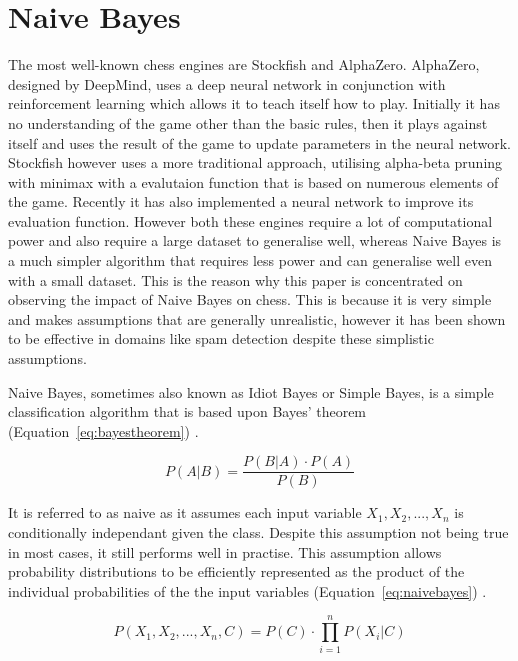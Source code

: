 \section{Naive Bayes}
The most well-known chess engines are Stockfish and AlphaZero. AlphaZero, designed by DeepMind, uses a deep neural network in conjunction with reinforcement learning which allows it to teach itself how to play. Initially it has no understanding of the game other than the basic rules, then it plays against itself and uses the result of the game to update parameters in the neural network. Stockfish however uses a more traditional approach, utilising alpha-beta pruning with minimax with a evalutaion function that is based on numerous elements of the game. Recently it has also implemented a neural network to improve its evaluation function. However both these engines require a lot of computational power and also require a large dataset to generalise well, whereas Naive Bayes is a much simpler algorithm that requires less power and can generalise well even with a small dataset. This is the reason why this paper is concentrated on observing the impact of Naive Bayes on chess. This is because it is very simple and makes assumptions that are generally unrealistic, however it has been shown to be effective in domains like spam detection \cite{eberhardtBayesianSpamDetection2015} despite these simplistic assumptions. 

Naive Bayes, sometimes also known as Idiot Bayes or Simple Bayes, is a simple classification algorithm that is based upon Bayes' theorem (Equation~\ref{eq:bayestheorem}) \cite{lowdNaiveBayesModels2005}. 

\begin{equation}
    \label{eq:bayestheorem}
    P(A|B) = \frac{P(B|A) \cdot P(A)}{P(B)}
\end{equation}

It is referred to as naive as it assumes each input variable $X_1, X_2,..., X_n $ is conditionally independant given the class. Despite this assumption not being true in most cases, it still performs well in practise. This assumption allows probability distributions to be efficiently represented as the product of the individual probabilities of the the input variables (Equation~\ref{eq:naivebayes}) \cite{lowdNaiveBayesModels2005}.

\begin{equation}
\label{eq:naivebayes}
P(X_1, X_2, ..., X_n, C) ={P(C)}\cdot \prod_{i=1}^{n}{P(X_i | C)}
\end{equation}
